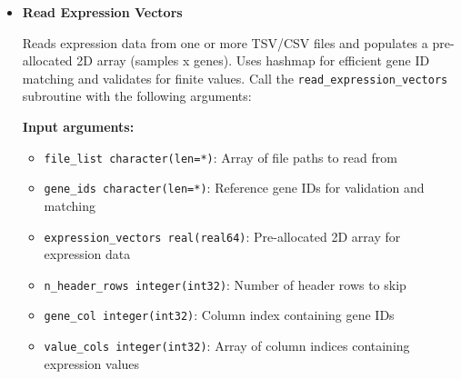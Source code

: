 \begin{enumerate}
\begin{enumerate}
\begin{itemize}
\begin{lstlisting}[language=Fortran, caption={Read Gene IDs from TSV File}]
integer(int32) :: ierr

call read_gene_ids_from_tsv_file('expression_data.tsv', &
                             gene_ids, 1, 1, ierr)
                          \end{lstlisting}
                          
                    \item \textbf{Read Expression Vectors}
                          
                          Reads expression data from one or more TSV/CSV files and populates
                          a pre-allocated 2D array (samples x genes). Uses hashmap for
                          efficient gene ID matching and validates for finite values. Call the
                          \texttt{read\_expression\_vectors} subroutine with the following
                          arguments:
                          
                          \textbf{Input arguments:}
                          \begin{itemize}
                            \item \texttt{file\_list character(len=*)}: Array of file paths to
                                  read from
                                  
                            \item \texttt{gene\_ids character(len=*)}: Reference gene IDs for
                                  validation and matching
                                  
                            \item \texttt{expression\_vectors real(real64)}: Pre-allocated 2D
                                  array for expression data
                                  
                            \item \texttt{n\_header\_rows integer(int32)}: Number of header rows
                                  to skip
                                  
                            \item \texttt{gene\_col integer(int32)}: Column index containing
                                  gene IDs
                                  
                            \item \texttt{value\_cols integer(int32)}: Array of column indices
                                  containing expression values
                                  

\end{itemize}
\end{itemize}
\end{enumerate}
\end{enumerate}
